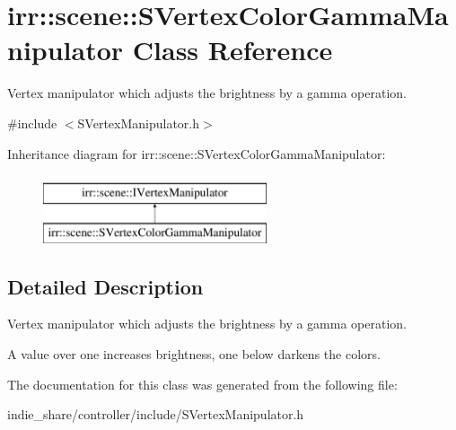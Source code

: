 \hypertarget{classirr_1_1scene_1_1SVertexColorGammaManipulator}{}\section{irr\+:\+:scene\+:\+:S\+Vertex\+Color\+Gamma\+Manipulator Class Reference}
\label{classirr_1_1scene_1_1SVertexColorGammaManipulator}


Vertex manipulator which adjusts the brightness by a gamma operation.  




{\ttfamily \#include $<$S\+Vertex\+Manipulator.\+h$>$}

Inheritance diagram for irr\+:\+:scene\+:\+:S\+Vertex\+Color\+Gamma\+Manipulator\+:\begin{figure}[H]
\begin{center}
\leavevmode
\includegraphics[height=2.000000cm]{classirr_1_1scene_1_1SVertexColorGammaManipulator}
\end{center}
\end{figure}


\subsection{Detailed Description}
Vertex manipulator which adjusts the brightness by a gamma operation. 

A value over one increases brightness, one below darkens the colors. 

The documentation for this class was generated from the following file\+:\begin{DoxyCompactItemize}
\item 
indie\+\_\+share/controller/include/S\+Vertex\+Manipulator.\+h\end{DoxyCompactItemize}
